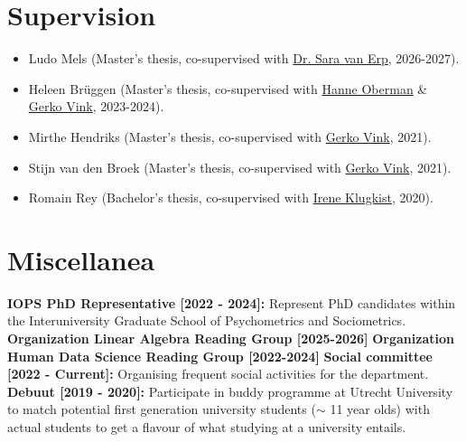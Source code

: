 \documentclass[11pt,a4paper,roman,colorlinks,linkcolor = blue]{moderncv}        %
\begin{document}
\section{Supervision}
\begin{itemize} 
  \item[$\circ$] Ludo Mels (Master's thesis, co-supervised with \href{https://www.saravanerp.com/}{Dr. Sara van Erp}, 2026-2027).
  \item[$\circ$] Heleen Br{\"u}ggen (Master's thesis, co-supervised with \href{https://hanneoberman.github.io/}{Hanne Oberman} \& \href{https://www.gerkovink.com}{Gerko Vink}, 2023-2024).
  \item[$\circ$] Mirthe Hendriks (Master's thesis, co-supervised with \href{https://www.gerkovink.com}{Gerko Vink}, 2021).
  \item[$\circ$] Stijn van den Broek (Master's thesis, co-supervised with \href{https://www.gerkovink.com}{Gerko Vink}, 2021). 
  \item[$\circ$] Romain Rey (Bachelor's thesis, co-supervised with \href{https://www.uu.nl/medewerkers/iklugkist}{Irene Klugkist}, 2020). 
\end{itemize}



\section{Miscellanea}

\textbf{IOPS PhD Representative [2022 - 2024]:} Represent PhD candidates within the Interuniversity Graduate School of Psychometrics and Sociometrics.
\textbf{Organization Linear Algebra Reading Group [2025-2026]}
\textbf{Organization Human Data Science Reading Group [2022-2024]}
\textbf{Social committee [2022 - Current]:} Organising frequent social activities for the department. 
\textbf{Debuut [2019 - 2020]:} Participate in buddy programme at Utrecht University to match potential first generation university students ($\sim$ 11 year olds) with actual students to get a flavour of what studying at a university entails.

\end{document}
